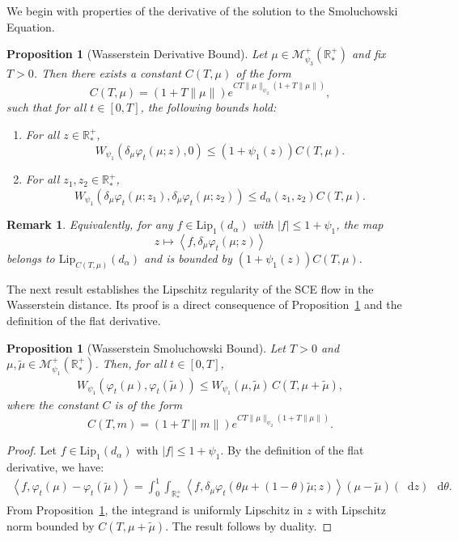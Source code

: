 \documentclass[11pt,a4paper]{article}
\newcommand{\RRP}{\mathbb{R}^+_*}
\newcommand{\MC}{\mathcal{M}}
\newcommand{\brac}[1]{\left\langle#1\right\rangle}
\newcommand{\dd}{\mathop{}\!\mathrm{d}}
\newtheorem{remark}[theorem]{Remark}
\newtheorem{proposition}[theorem]{Proposition}
\begin{document}
We begin with properties of the derivative of the solution to the Smoluchowski Equation.

\begin{proposition}[Wasserstein Derivative Bound]\label{prop:wass-derivative}
    Let $\mu \in \MC^+_{\psi_3}(\RRP)$ and fix $T > 0$. Then there exists a constant $C(T,\mu)$ of the form
    \[
    C(T,\mu) = (1 + T\|\mu\|) e^{CT\|\mu\|_{\psi_2}\left(1 + T\|\mu\|\right)},
    \]
    such that for all $t \in [0, T]$, the following bounds hold:
    \begin{enumerate}
        \item For all $z \in \RRP$,
        \[
        W_{\psi_1}\left( \delta_\mu \varphi_t(\mu; z), 0 \right) \leq (1 + \psi_1(z)) C(T,\mu).
        \]
        \item For all $z_1, z_2 \in \RRP$,
        \[
        W_{\psi_1}\left( \delta_\mu \varphi_t(\mu; z_1), \delta_\mu \varphi_t(\mu; z_2) \right) \leq d_\alpha(z_1, z_2) C(T,\mu).
        \]
    \end{enumerate}
\end{proposition}

\begin{remark}
    Equivalently, for any $f \in \mathrm{Lip}_1(d_\alpha)$ with $|f| \leq 1 + \psi_1$, the map
    \[
    z \mapsto \brac{f, \delta_\mu \varphi_t(\mu; z)}
    \]
    belongs to $\mathrm{Lip}_{C(T,\mu)}(d_\alpha)$ and is bounded by $(1 + \psi_1(z)) C(T,\mu)$.
\end{remark}

The next result establishes the Lipschitz regularity of the SCE flow in the Wasserstein distance. Its proof is a direct consequence of Proposition~\ref{prop:wass-derivative} and the definition of the flat derivative.

\begin{proposition}[Wasserstein Smoluchowski Bound]\label{prop:wass-sce}
    Let $T > 0$ and $\mu, \tilde{\mu} \in \MC^+_{\psi_1}(\RRP)$. Then, for all $t \in [0,T]$,
    \begin{align*}
        W_{\psi_1} (\varphi_t(\mu),\varphi_t(\tilde{\mu})) \leq W_{\psi_1} (\mu,\tilde{\mu})\, C(T,\mu + \tilde{\mu}),
    \end{align*}
    where the constant $C$ is of the form
    \[
        C(T,m) = (1 + T\|m\|)e^{CT\|\mu\|_{\psi_2}\left(1 + T\|\mu\|\right)}.
    \]
\end{proposition}

\begin{proof}
    Let $f \in \mathrm{Lip}_1(d_\alpha)$ with $|f| \leq 1 + \psi_1$. By the definition of the flat derivative, we have:
    \begin{align*}
        \brac{f,\varphi_t(\mu)-\varphi_t(\tilde{\mu})} = \int_0^1 \int_{\RRP} \brac{f, \delta_\mu\varphi_t(\theta\mu + (1-\theta)\tilde{\mu};z)} \left(\mu-\tilde{\mu}\right)(\dd z)\, \dd \theta.
    \end{align*}
    From Proposition~\ref{prop:wass-derivative}, the integrand is uniformly Lipschitz in $z$ with Lipschitz norm bounded by $C(T,\mu + \tilde{\mu})$. The result follows by duality.
\end{proof}
\end{document}
